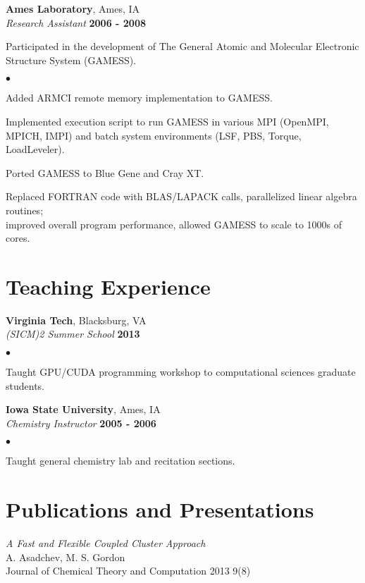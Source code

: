 \documentclass[overlap,line]{cv}
\newenvironment{list2}{
  \begin{list}{$\bullet$}{%
      \setlength{\itemsep}{0in}
      \setlength{\parsep}{0in} \setlength{\parskip}{0in}
      \setlength{\topsep}{0in} \setlength{\partopsep}{0in} 
      \setlength{\leftmargin}{0.2in}}}{\end{list}}
\begin{document}
\begin{resume}
{\bf Ames Laboratory}, Ames, IA \\
{\it Research Assistant} \hfill {\bf 2006 - 2008}

Participated in the development of The General Atomic and Molecular Electronic Structure System
(GAMESS).
\vspace{.05in}
\begin{list2}
\item Added ARMCI remote memory implementation to GAMESS.
\item Implemented execution script to run GAMESS in various MPI (OpenMPI, MPICH, IMPI)
  and batch system environments (LSF, PBS, Torque, LoadLeveler).
\item Ported GAMESS to Blue Gene and Cray XT.
\item Replaced FORTRAN code with BLAS/LAPACK calls, parallelized linear algebra routines; \\
  improved overall program performance, allowed GAMESS to scale to 1000s of cores.
\end{list2}


\section{\sc Teaching Experience}
\vspace{.05in}
{\bf Virginia Tech}, Blacksburg, VA \\
{\em (SICM)2 Summer School} \hfill {\bf 2013}

\begin{list2}
\item Taught GPU/CUDA programming workshop to computational sciences graduate students.
\end{list2}

{\bf Iowa State University}, Ames, IA \\
{\em Chemistry Instructor}  \hfill {\bf 2005 - 2006}

\begin{list2}
\item Taught general chemistry lab and recitation sections. 
\end{list2}

\newpage

\section{\sc Publications and Presentations}
\vspace{.05in}

{\it A Fast and Flexible Coupled Cluster Approach} \\
A. Asadchev, M. S. Gordon \\
Journal of Chemical Theory and Computation 2013 9(8)


\end{resume}
\end{document}
